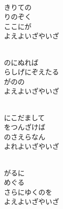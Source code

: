 \documentclass[10pt,b5j]{tarticle} %
\begin{document}
\vspace{1.5em} %
\newcommand{\linespace}{0.5em} %
\newcommand{\blocksize}{0.5\hsize} %
\newcommand{\itemmargin}{6em} %
\begin{enumerate} %
    \setlength{\itemindent}{\itemmargin} %
    \begin{minipage}[c]{\blocksize}
    
        \vspace{\linespace}
        \item~\\
        きりての\\
        りのぞく\\
        ここにが\\
        よえよいざやいざ
        
        \vspace{\linespace}
        \item~\\
        のにぬれば\\
        らしげにぞえたる\\
        がのの\\
        よえよいざやいざ
        
        \vspace{\linespace}
        \item~\\
        にこだまして\\
        をつんざけば\\
        のさえらなん\\
        よれよいざやいざ
        
        \vspace{\linespace}
        \item~\\
        がるに\\
        めぐる\\
        さらにゆくのを\\
        よえよいざやいざ
    
    \end{minipage}
\end{enumerate} %
\end{document}
